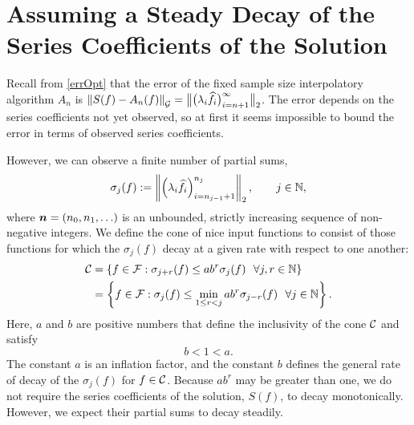 \documentclass[graybox,footinfo]{svmult}
\newcommand{\DHJRnorm}[2][{}]{\ensuremath{\left \lVert #2 \right \rVert}_{#1}}
\newcommand{\DHJRbignorm}[2][{}]{\ensuremath{\bigl \lVert #2 \bigr \rVert}_{#1}}
\begin{document}
\section{Assuming a Steady Decay of the Series Coefficients of the Solution} \label{sec:cone}

Recall from \eqref{errOpt} that the error of the fixed sample size interpolatory algorithm $A_n$ is $\DHJRnorm[\calG]{S(f) - A_n(f)} = \DHJRbignorm[2]{\bigl(\lambda_{i} \widehat{f}_{i} \bigr)_{i= n+1}^{\infty}}$.  The error depends on the series coefficients not yet observed, so at first it seems impossible to bound the error in terms of observed series coefficients.  

However, we can observe a finite number of partial sums, 
\begin{equation} \label{sumdef}
\sigma_j(f) :
= \DHJRnorm[2]{ \left(\lambda_{i} \widehat{f}_{i} \right)_{i=n_{j-1}+1}^{n_j}}, \qquad j \in \bbN,
\end{equation}
where ${\boldsymbol{n}}  = (n_0, n_1, \ldots)$ is an unbounded, strictly increasing sequence of non-negative integers.  We define the cone of nice input functions to consist of those functions for which the $\sigma_j(f)$ decay at a given rate with respect to one another:
\begin{align} \label{decayconedef}
\calC &= \left\{ f \in \calF : \sigma_{j+r}(f) \le ab^r \sigma_j (f) \ \ \forall j,r \in \bbN \right\} \\
\nonumber
& = \left\{ f \in \calF : \sigma_j(f) \le \min_{1 \le r < j}ab^r\sigma_{j-r}(f) \ \ \forall j \in \bbN \right\}.
\end{align}
Here, $a$ and $b$ are positive numbers that define the inclusivity of the cone ${\mathcal{C}}$ and satisfy
\begin{equation*} \label{abcond}
b <1 < a.
\end{equation*}
The constant $a$ is an inflation factor, and the constant $b$ defines the general rate of decay of the $\sigma_j(f)$ for $f \in {\mathcal{C}}$. Because $ab^r$ may be greater than one, we do not require the series coefficients of the solution, $S(f)$, to decay monotonically. However, we expect their partial sums to decay steadily.
\end{document}
